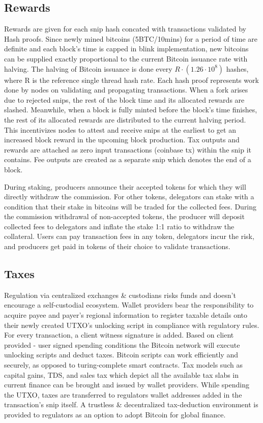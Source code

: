 \documentclass[a4paper,10pt]{article}
\begin{document}
\subsection{Rewards}
Rewards are given for each snip hash concated with transactions validated by Hash proofs. Since newly mined bitcoins (5BTC/10mins) for a period of time are definite and each block's time is capped in blink implementation, new bitcoins can be supplied exactly proportional to the current Bitcoin issuance rate with halving. The halving of Bitcoin issuance is done every $R \cdot (1.26 \cdot 10^8)$ hashes, where R is the reference single thread hash rate. Each hash proof represents work done by nodes on validating and propagating transactions. When a fork arises due to rejected snips, the rest of the block time and its allocated rewards are slashed. Meanwhile, when a block is fully minted before the block's time finishes, the rest of its allocated rewards are distributed to the current halving period. This incentivizes nodes to attest and receive snips at the earliest to get an increased block reward in the upcoming block production. Tax outputs and rewards are attached as zero input transactions (coinbase tx) within the snip it contains. Fee outputs are created as a separate snip which denotes the end of a block.

During staking, producers announce their accepted tokens for which they will directly withdraw the commission. For other tokens, delegators can stake with a condition that their stake in bitcoins will be traded for the collected fees. During the commission withdrawal of non-accepted tokens, the producer will deposit collected fees to delegators and inflate the stake 1:1 ratio to withdraw the collateral. Users can pay transaction fees in any token, delegators incur the risk, and producers get paid in tokens of their choice to validate transactions.


\subsection{Taxes}
Regulation via centralized exchanges \& custodians risks funds and doesn't encourage a self-custodial ecosystem. Wallet providers bear the responsibility to acquire payee and payer's regional information to register taxable details onto their newly created UTXO's unlocking script in compliance with regulatory rules. For every transaction, a client witness signature is added. Based on client provided - user signed spending conditions the Bitcoin network will execute unlocking scripts and deduct taxes. Bitcoin scripts can work efficiently and securely, as opposed to turing-complete smart contracts. Tax models such as capital gains, TDS, and sales tax which depict all the available tax slabs in current finance can be brought and issued by wallet providers. While spending the UTXO, taxes are transferred to regulators wallet addresses added in the transaction's snip itself. A trustless \& decentralized tax-deduction environment is provided to regulators as an option to adopt Bitcoin for global finance.
\end{document}
